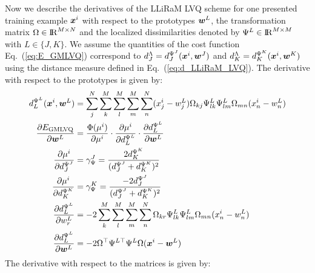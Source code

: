 Now we describe the derivatives of the \ac{LLiRaM LVQ} scheme for one presented training example $\boldsymbol{x}^i$ 
with respect to the prototypes $\boldsymbol{w}^L$, the transformation matrix $\Omega\in{\rm I\!R}^{M\times N}$ 
and the localized dissimilarities denoted by $\Psi^L\in{\rm I\!R}^{M\times M}$ with $L\in\{J,K\}$.
We assume the quantities of the cost function Eq.\ (\ref{eq:E_GMLVQ}) correspond to $d_J^\Lambda=d_J^{\Psi^J}(\boldsymbol{x}^i,\boldsymbol{w}^J)$ 
and $d_K^\Lambda=d_K^{\Psi^K}(\boldsymbol{x}^i,\boldsymbol{w}^K)$ using the distance measure defined in 
Eq.\ (\ref{eq:d_LLiRaM_LVQ}). The derivative with respect to the prototypes is given by:%
\begin{align}
\label{eq:d_LLiRaM_LVQ_sums}
d^{\Psi^L}_L(\v{x}^i,\v{w}^L) &= 
\sum^N_j\sum_k^M\sum_l^M\sum_m^M\sum_n^N (x^i_j-w^L_j)\Omega_{kj}\Psi^L_{lk}\Psi^L_{lm}\Omega_{mn}(x^i_n-w^L_n) \\
% 
\label{eq:derivative_LLiRaM_w}
\frac{\partial E_{\mathrm{GMLVQ}}}{\partial \v{w}^L} &= \frac{\Phi(\mu^i)}{\partial \mu^i}\cdot\frac{\partial \mu^i}{\partial d^{\Psi^L}_L}
\cdot\frac{\partial d^{\Psi^L}_L}{\partial \v{w}^L} \\
% 
\frac{\partial \mu^i}{\partial d_J^{\Psi^J}} &= \gamma_\Psi^{J} = \frac{2d_K^{\Psi^K}}{(d_J^{\Psi^J}+d_K^{\Psi^K})^2} \\
% 
\frac{\partial \mu^i}{\partial d_K^{\Psi^K}} &= \gamma_\Psi^{K} =\frac{-2d_J^{\Psi^J}}{(d_J^{\Psi^J}+d_K^{\Psi^K})^2} \\
\notag\frac{\partial d_L^{\Psi^L}}{\partial w^L_r} &= 
-2\sum^M_k\sum^M_l\sum^M_m\sum^N_n \Omega_{kr}\Psi^L_{lk}\Psi^L_{lm}\Omega_{mn}(x^i_n-w^L_n) \\
\frac{\partial d_L^{\Psi^L}}{\partial \v{w}^L} &= -2 \Omega^\top\Psi^{L\top}\Psi^L\Omega(\v{x}^i-\v{w}^L)
\end{align}
The derivative with respect to the matrices is given by:
